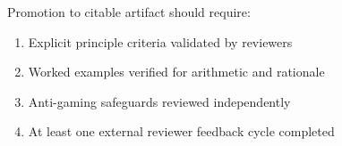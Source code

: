 \documentclass[
]{article}
\providecommand{\tightlist}{%
  \setlength{\itemsep}{0pt}\setlength{\parskip}{0pt}}
\begin{document}
Promotion to citable artifact should require:

\begin{enumerate}
\def\labelenumi{\arabic{enumi}.}
\tightlist
\item
  Explicit principle criteria validated by reviewers
\item
  Worked examples verified for arithmetic and rationale
\item
  Anti-gaming safeguards reviewed independently
\item
  At least one external reviewer feedback cycle completed
\end{enumerate}
\end{document}
